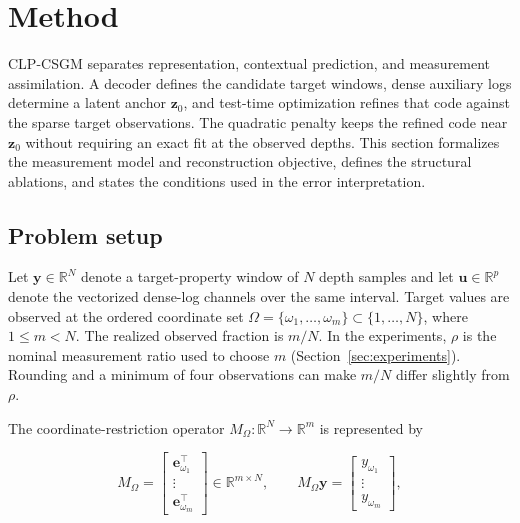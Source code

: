 \section{Method}
\label{sec:method}

CLP-CSGM separates representation, contextual prediction, and measurement
assimilation. A decoder defines the candidate target windows, dense auxiliary
logs determine a latent anchor $\boldsymbol{z}_0$, and test-time optimization
refines that code against the sparse target observations. The quadratic
penalty keeps the refined code near $\boldsymbol{z}_0$ without requiring an
exact fit at the observed depths. This section formalizes the measurement
model and reconstruction objective, defines the structural ablations, and
states the conditions used in the error interpretation.

\subsection{Problem setup}
\label{subsec:problem_setup}

Let $\boldsymbol{y}\in\mathbb{R}^{N}$ denote a target-property window of $N$
depth samples and let $\boldsymbol{u}\in\mathbb{R}^{p}$ denote the vectorized
dense-log channels over the same interval. Target values are observed at the
ordered coordinate set
$\Omega=\{\omega_1,\ldots,\omega_m\}\subset\{1,\ldots,N\}$, where
$1\leq m<N$. The realized observed fraction is $m/N$.
In the experiments, $\rho$ is the nominal measurement ratio used to choose
$m$ (Section~\ref{sec:experiments}). Rounding and a minimum of four
observations can make $m/N$ differ slightly from $\rho$.

The coordinate-restriction operator
$M_{\Omega}:\mathbb{R}^{N}\rightarrow\mathbb{R}^{m}$ is represented by

\begin{equation}
M_{\Omega}
=
\begin{bmatrix}
\boldsymbol{e}_{\omega_1}^{\top}\\
\vdots\\
\boldsymbol{e}_{\omega_m}^{\top}
\end{bmatrix}
\in\mathbb{R}^{m\times N},
\qquad
M_{\Omega}\boldsymbol{y}
=
\begin{bmatrix}
y_{\omega_1}\\
\vdots\\
y_{\omega_m}
\end{bmatrix},
\label{eq:measurement_operator}
\end{equation}

